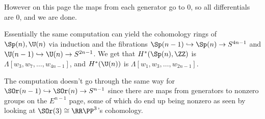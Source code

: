 \documentclass[12pt,oneside]{amsart}
\begin{document}
\begin{center}
\end{center}
However on this page the maps from each generator go to $0$, so all differentials are $0$, and we are done.

Essentially the same computation can yield the cohomology rings of $\Sp(n), \U(n)$ via induction and the fibrations $\Sp(n-1) \hookrightarrow \Sp(n) \to S^{4n-1}$ and $\U(n-1) \hookrightarrow \U(n) \to S^{2n-1}$. We get that $H^*(\Sp(n),\ZZ)$ is $\Lambda[w_3,w_7,\dots,w_{4n-1}]$, and $H^*(\U(n))$ is $\Lambda[w_1,w_3,\dots,w_{2n-1}]$.

The computation doesn't go through the same way for $\SOr(n-1) \hookrightarrow \SOr(n) \to S^{n-1}$ since there are maps from generators to nonzero groups on the $E^{n-1}$ page, some of which do end up being nonzero as seen by looking at $\SOr(3) \cong \RR\PP^3$'s cohomology.
\end{document}
